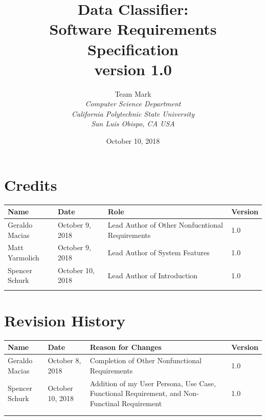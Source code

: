\documentclass[12pt,oneside,letterpaper]{article}
\begin{document}
\title{\bfseries Data Classifier: \\
Software Requirements Specification\\
version 1.0}

\author {
\large{Team Mark}\\
\emph{Computer Science Department}\\
\emph{California Polytechnic State University}\\
\emph{San Luis Obispo, CA USA}\\
}

\date{October 10, 2018}
\maketitle \thispagestyle{empty}


\pagebreak
\tableofcontents



\section*{Credits}
\begin{tabular}{|l|l|p{2.5in}|l|}
\hline
\textbf{Name}&\textbf{Date}&\textbf{Role}&\textbf{Version}\\
\hline
Geraldo Macias&October 9, 2018&Lead Author of Other Nonfucntional Requirements&1.0\\
\hline
Matt Yarmolich&October 9, 2018&Lead Author of System Features&1.0\\
\hline
Spencer Schurk&October 10, 2018&Lead Author of Introduction&1.0\\
\hline
&&&\\
\hline
\end{tabular}

\section*{Revision History}
\begin{tabular}{|l|l|p{2.5in}|l|}
\hline
\textbf{Name}&\textbf{Date}&\textbf{Reason for Changes}&\textbf{Version}\\
\hline
Geraldo Macias&October 8, 2018&Completion of Other Nonfunctional Requirements&1.0\\
\hline
Spencer Schurk&October 10, 2018&Addition of my User Persona, Use Case, Functional Requirement, and Non-Functinal Requirement&1.0\\
\hline
&&&\\
\hline
&&&\\
\hline
\end{tabular}
\end{document}
